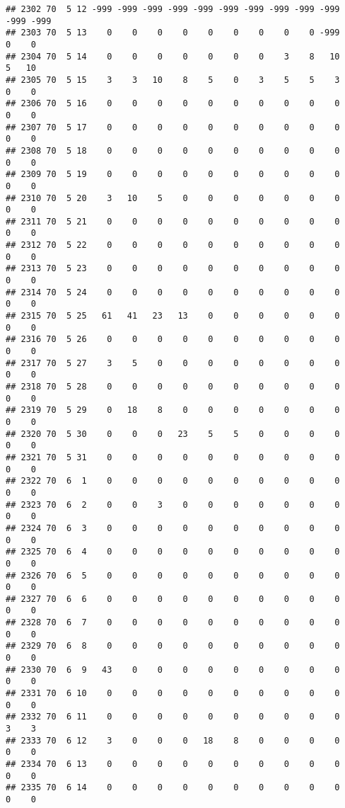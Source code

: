 \documentclass[]{article}
\begin{document}
\begin{verbatim}
## 2302 70  5 12 -999 -999 -999 -999 -999 -999 -999 -999 -999 -999 -999 -999
## 2303 70  5 13    0    0    0    0    0    0    0    0    0 -999    0    0
## 2304 70  5 14    0    0    0    0    0    0    0    3    8   10    5   10
## 2305 70  5 15    3    3   10    8    5    0    3    5    5    3    0    0
## 2306 70  5 16    0    0    0    0    0    0    0    0    0    0    0    0
## 2307 70  5 17    0    0    0    0    0    0    0    0    0    0    0    0
## 2308 70  5 18    0    0    0    0    0    0    0    0    0    0    0    0
## 2309 70  5 19    0    0    0    0    0    0    0    0    0    0    0    0
## 2310 70  5 20    3   10    5    0    0    0    0    0    0    0    0    0
## 2311 70  5 21    0    0    0    0    0    0    0    0    0    0    0    0
## 2312 70  5 22    0    0    0    0    0    0    0    0    0    0    0    0
## 2313 70  5 23    0    0    0    0    0    0    0    0    0    0    0    0
## 2314 70  5 24    0    0    0    0    0    0    0    0    0    0    0    0
## 2315 70  5 25   61   41   23   13    0    0    0    0    0    0    0    0
## 2316 70  5 26    0    0    0    0    0    0    0    0    0    0    0    0
## 2317 70  5 27    3    5    0    0    0    0    0    0    0    0    0    0
## 2318 70  5 28    0    0    0    0    0    0    0    0    0    0    0    0
## 2319 70  5 29    0   18    8    0    0    0    0    0    0    0    0    0
## 2320 70  5 30    0    0    0   23    5    5    0    0    0    0    0    0
## 2321 70  5 31    0    0    0    0    0    0    0    0    0    0    0    0
## 2322 70  6  1    0    0    0    0    0    0    0    0    0    0    0    0
## 2323 70  6  2    0    0    3    0    0    0    0    0    0    0    0    0
## 2324 70  6  3    0    0    0    0    0    0    0    0    0    0    0    0
## 2325 70  6  4    0    0    0    0    0    0    0    0    0    0    0    0
## 2326 70  6  5    0    0    0    0    0    0    0    0    0    0    0    0
## 2327 70  6  6    0    0    0    0    0    0    0    0    0    0    0    0
## 2328 70  6  7    0    0    0    0    0    0    0    0    0    0    0    0
## 2329 70  6  8    0    0    0    0    0    0    0    0    0    0    0    0
## 2330 70  6  9   43    0    0    0    0    0    0    0    0    0    0    0
## 2331 70  6 10    0    0    0    0    0    0    0    0    0    0    0    0
## 2332 70  6 11    0    0    0    0    0    0    0    0    0    0    3    3
## 2333 70  6 12    3    0    0    0   18    8    0    0    0    0    0    0
## 2334 70  6 13    0    0    0    0    0    0    0    0    0    0    0    0
## 2335 70  6 14    0    0    0    0    0    0    0    0    0    0    0    0

\end{verbatim}
\end{document}
